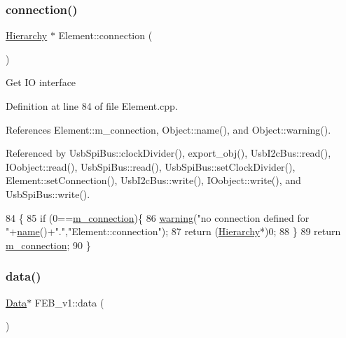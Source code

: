 \subsubsection{\texorpdfstring{connection()}{connection()}}
{\footnotesize\ttfamily \hyperlink{classHierarchy}{Hierarchy} $\ast$ Element\+::connection (\begin{DoxyParamCaption}{ }\end{DoxyParamCaption})\hspace{0.3cm}{\ttfamily [inherited]}}

Get IO interface 

Definition at line 84 of file Element.\+cpp.



References Element\+::m\+\_\+connection, Object\+::name(), and Object\+::warning().



Referenced by Usb\+Spi\+Bus\+::clock\+Divider(), export\+\_\+obj(), Usb\+I2c\+Bus\+::read(), I\+Oobject\+::read(), Usb\+Spi\+Bus\+::read(), Usb\+Spi\+Bus\+::set\+Clock\+Divider(), Element\+::set\+Connection(), Usb\+I2c\+Bus\+::write(), I\+Oobject\+::write(), and Usb\+Spi\+Bus\+::write().


\begin{DoxyCode}
84                               \{
85   \textcolor{keywordflow}{if} (0==\hyperlink{classElement_abe3de7a5dbbc9a6dd2d7e012e5fdb266}{m\_connection})\{
86     \hyperlink{classObject_a65cd4fda577711660821fd2cd5a3b4c9}{warning}(\textcolor{stringliteral}{"no connection defined for "}+\hyperlink{classObject_a300f4c05dd468c7bb8b3c968868443c1}{name}()+\textcolor{stringliteral}{"."},\textcolor{stringliteral}{"Element::connection"});
87     \textcolor{keywordflow}{return} (\hyperlink{classHierarchy}{Hierarchy}*)0;
88   \}
89   \textcolor{keywordflow}{return} \hyperlink{classElement_abe3de7a5dbbc9a6dd2d7e012e5fdb266}{m\_connection};
90 \}
\end{DoxyCode}
\mbox{\label{classFEB__v1_a6bca4320bd3bbbc32efc81097f33421a}} 
\subsubsection{\texorpdfstring{data()}{data()}}
{\footnotesize\ttfamily \hyperlink{classData}{Data}$\ast$ F\+E\+B\+\_\+v1\+::data (\begin{DoxyParamCaption}{ }\end{DoxyParamCaption})\hspace{0.3cm}{\ttfamily [inline]}}



